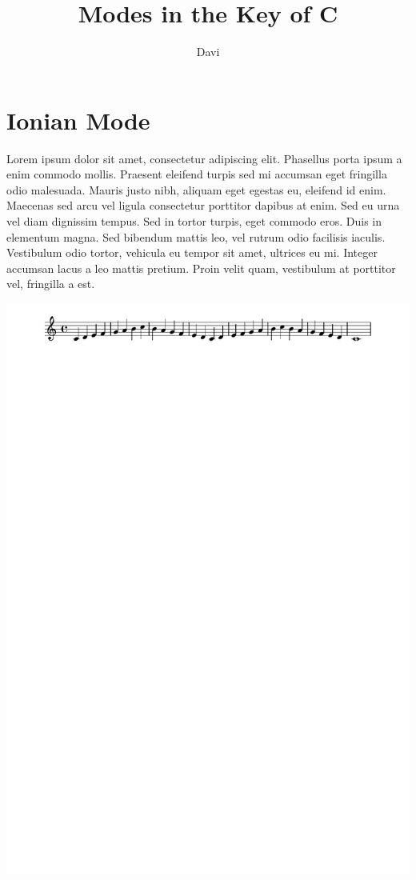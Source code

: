 \documentclass[11pt]{article}
\author{Davi}
\date{}
\title{Modes in the Key of C}
\begin{document}
\maketitle
\section*{Ionian Mode}
\label{sec:org480a2ee}

Lorem ipsum dolor sit amet, consectetur adipiscing elit. Phasellus
porta ipsum a enim commodo mollis. Praesent eleifend turpis sed mi
accumsan eget fringilla odio malesuada. Mauris justo nibh, aliquam
eget egestas eu, eleifend id enim. Maecenas sed arcu vel ligula
consectetur porttitor dapibus at enim. Sed eu urna vel diam dignissim
tempus. Sed in tortor turpis, eget commodo eros. Duis in elementum
magna. Sed bibendum mattis leo, vel rutrum odio facilisis iaculis.
Vestibulum odio tortor, vehicula eu tempor sit amet, ultrices eu mi.
Integer accumsan lacus a leo mattis pretium. Proin velit quam,
vestibulum at porttitor vel, fringilla a est.

\begin{center}
\includegraphics[width=.9\linewidth]{ionian.pdf}
\end{center}
\end{document}
